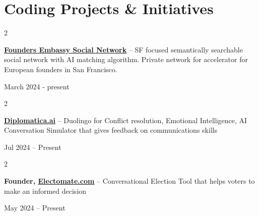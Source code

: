 \documentclass[10pt, letterpaper]{article}
\newenvironment{twocolentry}[2][]{
    \onecolentry
    \def\secondColumn{#2}
    \setcolumnwidth{\fill, 4.5 cm}
    \begin{paracol}{2}
}{
    \switchcolumn \raggedleft \secondColumn
    \end{paracol}
    \endonecolentry
} %
\begin{document}



     






    \section{Coding Projects \& Initiatives }

     \begin{twocolentry}
        {March 2024 - present}
            \textbf{\underline{Founders Embassy Social Network}} – SF focused semantically searchable social network with AI matching algorithm. Private network for accelerator for European founders in San Francisco.
        \end{twocolentry}




                \vspace{0.2 cm}


    \begin{twocolentry}
        {        Jul 2024 – Present}
            \href{https://diplomatica.ai/}{\textbf{\underline{Diplomatica.ai}}} – Duolingo for Conflict resolution, Emotional Intelligence, AI Conversation Simulator that gives feedback on communications skills
        \end{twocolentry}

        \vspace{0.2 cm}

        \begin{twocolentry}
        {        May 2024 – Present}
            \textbf{Founder, \href{https://electomate.com/}{\underline{Electomate.com}}} – Conversational Election Tool that helps voters to make an informed decision
        \end{twocolentry}
        
\end{document}
